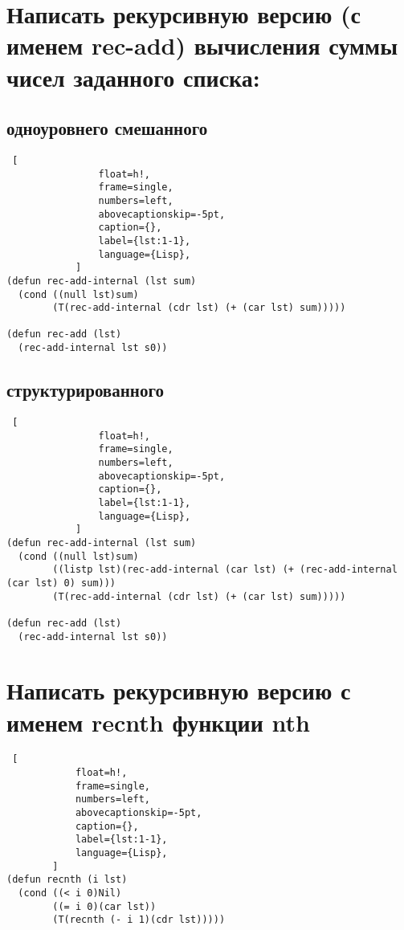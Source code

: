     \section{Написать рекурсивную версию (с именем rec-add) вычисления суммы чисел заданного списка:}
    
        \subsection{одноуровнего смешанного}
            \begin{lstlisting} [
            	float=h!,
            	frame=single,
            	numbers=left,
            	abovecaptionskip=-5pt,
            	caption={},
            	label={lst:1-1},
            	language={Lisp},
            ]
(defun rec-add-internal (lst sum)
  (cond ((null lst)sum)
        (T(rec-add-internal (cdr lst) (+ (car lst) sum)))))
        
(defun rec-add (lst)
  (rec-add-internal lst s0))
            \end{lstlisting}
    
        \subsection{структурированного}
            \begin{lstlisting} [
            	float=h!,
            	frame=single,
            	numbers=left,
            	abovecaptionskip=-5pt,
            	caption={},
            	label={lst:1-1},
            	language={Lisp},
            ]
(defun rec-add-internal (lst sum)
  (cond ((null lst)sum)
        ((listp lst)(rec-add-internal (car lst) (+ (rec-add-internal (car lst) 0) sum)))
        (T(rec-add-internal (cdr lst) (+ (car lst) sum)))))
        
(defun rec-add (lst)
  (rec-add-internal lst s0))
            \end{lstlisting}

    \section{Написать рекурсивную версию с именем recnth функции nth}
    
        \begin{lstlisting} [
        	float=h!,
        	frame=single,
        	numbers=left,
        	abovecaptionskip=-5pt,
        	caption={},
        	label={lst:1-1},
        	language={Lisp},
        ]
(defun recnth (i lst)
  (cond ((< i 0)Nil)
        ((= i 0)(car lst))
        (T(recnth (- i 1)(cdr lst)))))
        \end{lstlisting}

